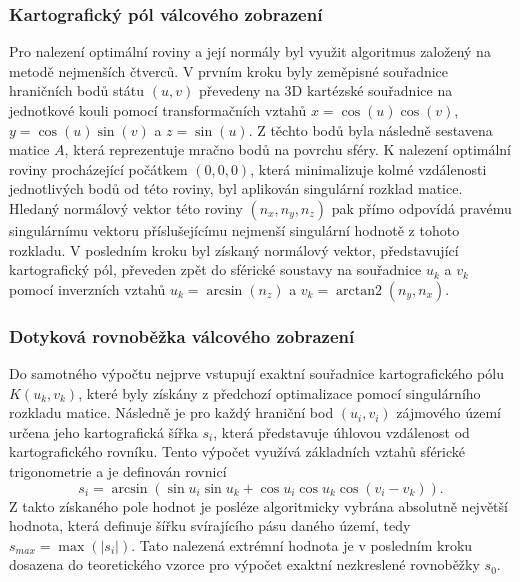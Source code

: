 \documentclass[12pt]{article}
\begin{document}
\subsubsection*{Kartografický pól válcového zobrazení}
Pro nalezení optimální roviny a její normály byl využit algoritmus založený na metodě nejmenších čtverců. V prvním kroku byly zeměpisné souřadnice hraničních bodů státu $(u, v)$ převedeny na 3D kartézské souřadnice na jednotkové kouli pomocí transformačních vztahů $x = \cos(u)\cos(v)$, $y = \cos(u)\sin(v)$ a $z = \sin(u)$. Z těchto bodů byla následně sestavena matice $A$, která reprezentuje mračno bodů na povrchu sféry. K nalezení optimální roviny procházející počátkem $(0, 0, 0)$, která minimalizuje kolmé vzdálenosti jednotlivých bodů od této roviny, byl aplikován singulární rozklad matice. Hledaný normálový vektor této roviny $(n_x, n_y, n_z)$ pak přímo odpovídá pravému singulárnímu vektoru příslušejícímu nejmenší singulární hodnotě z tohoto rozkladu. V posledním kroku byl získaný normálový vektor, představující kartografický pól, převeden zpět do sférické soustavy na souřadnice $u_k$ a $v_k$ pomocí inverzních vztahů $u_k = \arcsin(n_z)$ a $v_k = \operatorname{arctan2}(n_y, n_x)$. 
\subsubsection*{Dotyková rovnoběžka válcového zobrazení}
Do samotného výpočtu nejprve vstupují exaktní souřadnice kartografického pólu $K(u_k, v_k)$, které byly získány z předchozí optimalizace pomocí singulárního rozkladu matice. Následně je pro každý hraniční bod $(u_i, v_i)$ zájmového území určena jeho kartografická šířka $s_i$, která představuje úhlovou vzdálenost od kartografického rovníku. Tento výpočet využívá základních vztahů sférické trigonometrie a je definován rovnicí
$$s_i = \arcsin(\sin u_i \sin u_k + \cos u_i \cos u_k \cos(v_i - v_k)).$$
Z takto získaného pole hodnot je posléze algoritmicky vybrána absolutně největší hodnota, která definuje šířku svírajícího pásu daného území, tedy $s_{max} = \max(|s_i|)$. Tato nalezená extrémní hodnota je v posledním kroku dosazena do teoretického vzorce pro výpočet exaktní nezkreslené rovnoběžky $s_0$.
\end{document}
